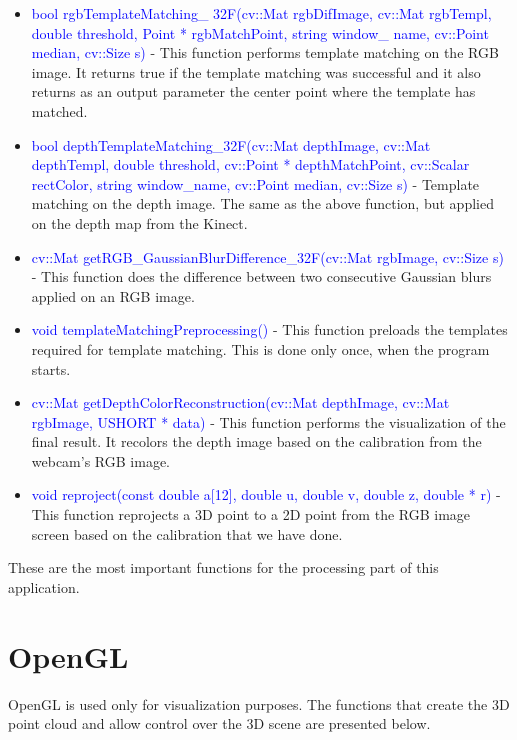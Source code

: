 \begin{itemize}
	\item \textcolor{blue}{bool rgbTemplateMatching\_ 32F(cv::Mat rgbDifImage, cv::Mat rgbTempl, double threshold, Point * rgbMatchPoint, string window\_ name, cv::Point median, cv::Size s)} - This function performs template matching on the RGB image. It returns true if the template matching was successful and it also returns as an output parameter the center point where the template has matched. 
	\item \textcolor{blue}{bool depthTemplateMatching\_32F(cv::Mat depthImage, cv::Mat depthTempl, double threshold, cv::Point * depthMatchPoint, cv::Scalar rectColor, string window\_name, cv::Point median, cv::Size s)} - Template matching on the depth image. The same as the above function, but applied on the depth map from the Kinect. 
	\item \textcolor{blue}{cv::Mat getRGB\_GaussianBlurDifference\_32F(cv::Mat rgbImage, cv::Size s)} - This function does the difference between two consecutive Gaussian blurs applied on an RGB image. 
	\item \textcolor{blue}{void templateMatchingPreprocessing()} - This function preloads the templates required for template matching. This is done only once, when the program starts. 
	\item \textcolor{blue}{cv::Mat getDepthColorReconstruction(cv::Mat depthImage, cv::Mat rgbImage, USHORT * data)} - This function performs the visualization of the final result. It recolors the depth image based on the calibration from the webcam's RGB image. 
	\item \textcolor{blue}{void reproject(const double a[12], double u, double v, double z, double * r) } - This function reprojects a 3D point to a 2D point from the RGB image screen based on the calibration that we have done. 
\end{itemize}

\noindent
These are the most important functions for the processing part of this application.  

\section{OpenGL}
\noindent
OpenGL is used only for visualization purposes. The functions that create the 3D point cloud and allow control over the 3D scene are presented below.

